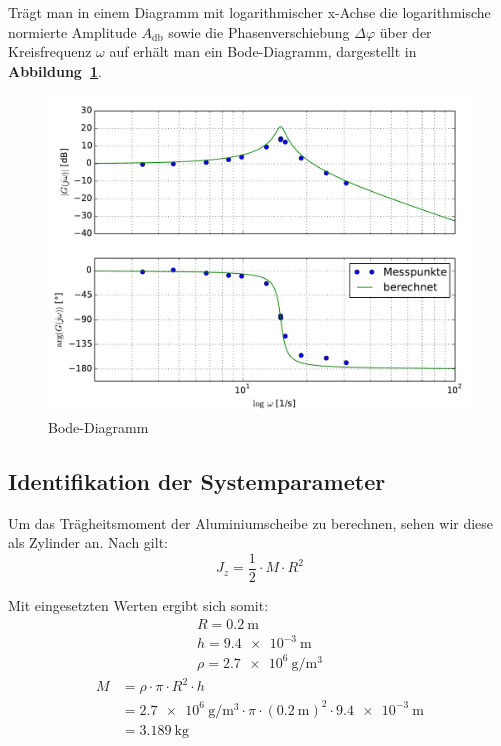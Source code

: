 \documentclass[a4paper,12pt]{scrartcl}
\begin{document}
Trägt man in einem Diagramm mit logarithmischer x-Achse die logarithmische normierte Amplitude $A_{\si{\decibel}}$ sowie die Phasenverschiebung $\Delta \varphi$ über der Kreisfrequenz $\omega$ auf erhält man ein Bode-Diagramm, dargestellt in \textbf{Abbildung~\ref{fig:plot-bode}}.
\begin{figure}[h]
\centering
\includegraphics[width=\textwidth]{bode.pdf}
\caption{Bode-Diagramm}
\label{fig:plot-bode}
\end{figure}

\subsection{Identifikation der Systemparameter} %

Um das Trägheitsmoment der Aluminiumscheibe zu berechnen, sehen wir diese als Zylinder an.
Nach \cite{tbmetall}  gilt:
\begin{equation}
	\label{eq:J}
	J_z = \frac{1}{2} \cdot M \cdot R^2
\end{equation}

Mit eingesetzten Werten ergibt sich somit:
\begin{gather}
	R = \SI{0.2}{\metre} \\
	h = \SI{9.4e-3}{\metre} \\
	\rho = \SI{2.7e6}{\gram\per\cubic\metre}
\end{gather}
\begin{align}
	M &= \rho \cdot \pi \cdot R^2 \cdot h \\
	&= \SI{2.7e6}{\gram\per\cubic\metre} \cdot \pi \cdot \left( \SI{0.2}{\metre} \right)^2 \cdot \SI{9.4e-3}{\metre} \\
	&= \SI{3.189}{\kilogram}
\end{align}
\end{document}
